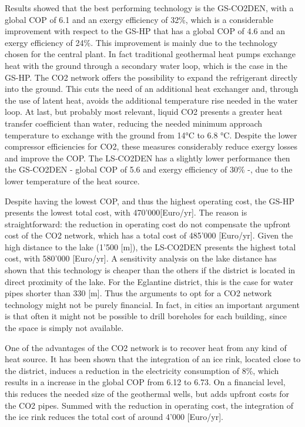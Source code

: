 \documentclass{article}
\begin{document}
Results showed that the best performing technology is the GS-CO2DEN, with a global COP of 6.1 and an exergy efficiency of 32\%, which is a considerable improvement with respect to the GS-HP that has a global COP of 4.6 and an exergy efficiency of 24\%. This improvement is mainly due to the technology chosen for the central plant. In fact traditional geothermal heat pumps exchange heat with the ground through a secondary water loop, which is the case in the GS-HP. The CO2 network offers the possibility to expand the refrigerant directly into the ground. This cuts the need of an additional heat exchanger and, through the use of latent heat, avoids the additional temperature rise needed in the water loop. At last, but probably most relevant, liquid CO2 presents a greater heat transfer coefficient than water, reducing the needed minimum approach temperature to exchange with the ground from 14\si{\celsius} to 6.8 \si{\celsius}. Despite the lower compressor efficiencies for CO2, these measures considerably reduce exergy losses and improve the COP. The LS-CO2DEN has a slightly lower performance then the GS-CO2DEN - global COP of 5.6 and exergy efficiency of 30\% -, due to the lower temperature of the heat source.

Despite having the lowest COP, and thus the highest operating cost, the GS-HP presents the lowest total cost, with 470'000[Euro/yr]. The reason is straightforward: the reduction in operating cost do not compensate the upfront cost of the CO2 network, which has a total cost of 485'000 [Euro/yr]. Given the high distance to the lake (1'500 [m]), the LS-CO2DEN presents the highest total cost, with 580'000 [Euro/yr]. A sensitivity analysis on the lake distance has shown that this technology is cheaper than the others if the district is located in direct proximity of the lake. For the Eglantine district, this is the case for water pipes shorter than 330 [m]. Thus the arguments to opt for a CO2 network technology might not be purely financial. In fact, in cities an important argument is that often it might not be possible to drill boreholes for each building, since the space is simply not available.

One of the advantages of the CO2 network is to recover heat from any kind of heat source. It has been shown that the integration of an ice rink, located close to the district, induces a reduction in the electricity consumption of 8\%, which results in a increase in the global COP from 6.12 to 6.73. On a financial level, this reduces the needed size of the geothermal wells, but adds upfront costs for the CO2 pipes. Summed with the reduction in operating cost, the integration of the ice rink reduces the total cost of around 4'000 [Euro/yr].
\end{document}
